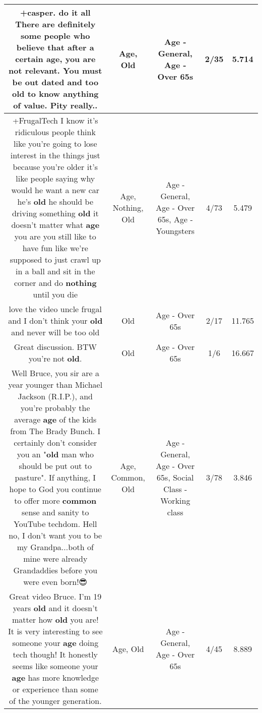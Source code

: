 \documentclass[11pt]{article}
\newlength\mylength
\begin{document}
\begin{center}
\begin{longtable}{|C{.65\mylength}|C{.30\mylength}|C{.12\mylength}|C{.12\mylength}|C{.12\mylength}|}
  \small +casper. do it all There are definitely  some people who believe that after a certain \textbf{age}, you are not relevant. You must be out dated and too \textbf{old} to know anything of value. Pity really..\normalsize   & Age, Old & Age - General, Age - Over 65s & 2/35 & 5.714 \\  \hline
  \small +FrugalTech I know it's ridiculous people think like you're going to lose interest in the things just because you're older it's like people saying why would he want a new car he's \textbf{old} he should be driving something \textbf{old} it doesn't matter what \textbf{age} you are you still like to have fun like we're supposed to just crawl up in a ball and sit in the corner and do \textbf{nothing} until you die\normalsize   & Age, Nothing, Old & Age - General, Age - Over 65s, Age - Youngsters & 4/73 & 5.479 \\  \hline
  \small love the video uncle frugal and I don't think your \textbf{old} and never will be too old\normalsize   & Old & Age - Over 65s & 2/17 & 11.765 \\  \hline
  \small Great discussion.  BTW you're not \textbf{old}.\normalsize   & Old & Age - Over 65s & 1/6 & 16.667 \\  \hline
  \small Well Bruce, you sir are a year younger than Michael Jackson (R.I.P.), and you're probably the average \textbf{age} of the kids from The Brady Bunch. I certainly don't consider you an "\textbf{old} man who should be put out to pasture". If anything, I hope to God you continue to offer more \textbf{common} sense and sanity to YouTube techdom. Hell no, I don't want you to be my Grandpa...both of mine were already Grandaddies before you were even born!😎\normalsize   & Age, Common, Old & Age - General, Age - Over 65s, Social Class - Working class & 3/78 & 3.846 \\  \hline
  \small Great video Bruce. I'm 19 years \textbf{old} and it doesn't matter how \textbf{old} you are! It is very interesting to see someone your \textbf{age} doing tech though! It honestly seems like someone your \textbf{age} has more knowledge or experience than some of the younger generation.\normalsize   & Age, Old & Age - General, Age - Over 65s & 4/45 & 8.889 \\  \hline

\end{longtable}
\end{center}
\end{document}
